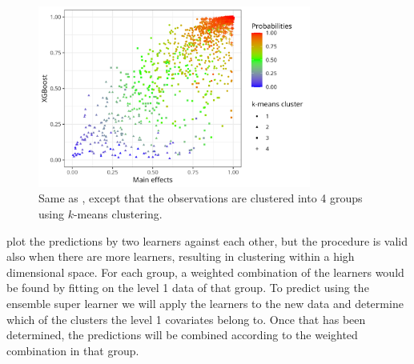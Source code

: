 \documentclass[./main.tex]{subfiles}
\begin{document}
\begin{figure}[H]
    \centering
    \includegraphics[width=0.8\textwidth]{figures/esl_preds_xgboost_vs_main_kmeans.png}
\caption{Same as , except that the observations are clustered into 4 groups using $ k $-means clustering.}
    \label{fig:esl_preds_xgboost_vs_main_kmeans}
\end{figure}
 plot the predictions by two learners against each other, but the procedure is valid also when there are more learners, resulting in clustering within a high dimensional space. For each group, a weighted combination of the learners would be found by fitting on the level 1 data of that group. To predict using the ensemble super learner we will apply the learners to the new data and determine which of the clusters the level 1 covariates belong to. Once that has been determined, the predictions will be combined according to the weighted combination in that group. 
\end{document}
